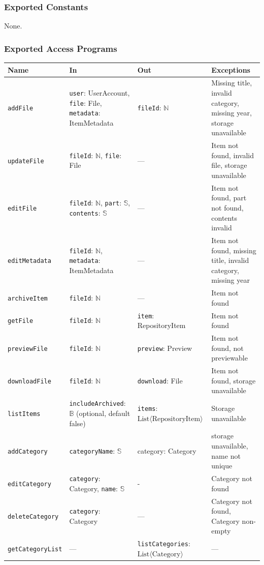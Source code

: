 \documentclass[12pt, titlepage]{article}
\begin{document}
\subsubsection{Exported Constants}
None.

\subsubsection{Exported Access Programs}
\begin{tabularx}{\textwidth}{p{2.8cm} p{4.4cm} p{3.8cm} X}
\toprule
\textbf{Name} & \textbf{In} & \textbf{Out} & \textbf{Exceptions} \\
\midrule
\texttt{addFile} & \texttt{user}: UserAccount, \texttt{file}: File, \texttt{metadata}: ItemMetadata & \texttt{fileId}: $\mathbb{N}$ & Missing title, invalid category, missing year, storage unavailable \\
\texttt{updateFile} & \texttt{fileId}: $\mathbb{N}$, \texttt{file}: File & --- & Item not found, invalid file, storage unavailable \\
\texttt{editFile} & \texttt{fileId}: $\mathbb{N}$, \texttt{part}: $\mathbb{S}$, \texttt{contents}: $\mathbb{S}$ & --- & Item not found, part not found, contents invalid \\
\texttt{editMetadata} & \texttt{fileId}: $\mathbb{N}$, \texttt{metadata}: ItemMetadata & --- & Item not found, missing title, invalid category, missing year \\
\texttt{archiveItem} & \texttt{fileId}: $\mathbb{N}$ & --- & Item not found \\
\texttt{getFile} & \texttt{fileId}: $\mathbb{N}$ & \texttt{item}: RepositoryItem & Item not found \\
\texttt{previewFile} & \texttt{fileId}: $\mathbb{N}$ & \texttt{preview}: Preview & Item not found, not previewable \\
\texttt{downloadFile} & \texttt{fileId}: $\mathbb{N}$ & \texttt{download}: File & Item not found, storage unavailable \\
\texttt{listItems} & \texttt{includeArchived}: $\mathbb{B}$ (optional, default false) & \texttt{items}: $\text{List}\langle \text{RepositoryItem} \rangle$ & Storage unavailable \\
\texttt{addCategory} & \texttt{categoryName}: $\mathbb{S}$ & category: Category & storage unavailable, name not unique \\
\texttt{editCategory} & \texttt{category}: Category, \texttt{name}: $\mathbb{S}$ & - & Category not found \\
\texttt{deleteCategory} & \texttt{category}: Category & --- & Category not found, Category non-empty \\
\texttt{getCategoryList} & --- & \texttt{listCategories}: $\text{List}\langle\text{Category}\rangle$ & --- \\
\bottomrule
\end{tabularx}
\end{document}
